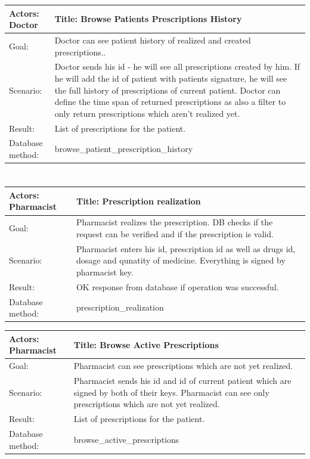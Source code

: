     \begin{longtable}{| p{6cm} | p{7.75cm} |}
    \hline
    Actors: Doctor &Title: Browse Patients Prescriptions History \\ \hline
    Goal: & Doctor can see patient history of realized and created prescriptions..\\ \hline
    Scenario: & Doctor sends his id - he will see all prescriptions created by him. If he will add the id of patient with patients signature, he will see the full history of prescriptions of current patient. Doctor can define the time span of returned prescriptions as also a filter to only return prescriptions which aren't realized yet. \\ \hline
    Result: & List of prescriptions for the patient. \\ \hline
    Database  method: & browse\_patient\_prescription\_history \\ \hline
    \end{longtable}
\normalsize

\section{}

\small
    \begin{longtable}{| p{6cm} | p{7.75cm} |}
    \hline
    Actors: Pharmacist &Title: Prescription realization\\ \hline
    Goal: & Pharmacist realizes the prescription. DB checks if the request can be verified and if the prescription is valid.\\ \hline
    Scenario: & Pharmacist enters his id, prescription id as well as drugs id, dosage and qunatity of medicine. Everything is signed by pharmacist key. \\ \hline
    Result: & OK response from database if operation was successful. \\ \hline
    Database  method: & prescription\_realization \\ \hline
    \end{longtable}



    \begin{longtable}{| p{6cm} | p{7.75cm} |}
    \hline
    Actors: Pharmacist &Title: Browse Active Prescriptions \\ \hline
    Goal: & Pharmacist can see prescriptions which are not yet realized. \\ \hline
    Scenario: & Pharmacist sends his id and id of current patient which are signed by both of their keys. Pharmacist can see only prescriptions which are not yet realized. \\ \hline
    Result: & List of prescriptions for the patient. \\ \hline
    Database  method: & browse\_active\_prescriptions \\ \hline
    \end{longtable}

